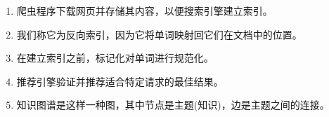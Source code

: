 \begin{enumerate}
	\item 爬虫程序下载网页并存储其内容，以便搜索引擎建立索引。
	\item 我们称它为反向索引，因为它将单词映射回它们在文档中的位置。
	\item 在建立索引之前，标记化对单词进行规范化。
	\item 推荐引擎验证并推荐适合特定请求的最佳结果。
	\item 知识图谱是这样一种图，其中节点是主题(知识)，边是主题之间的连接。
\end{enumerate}












